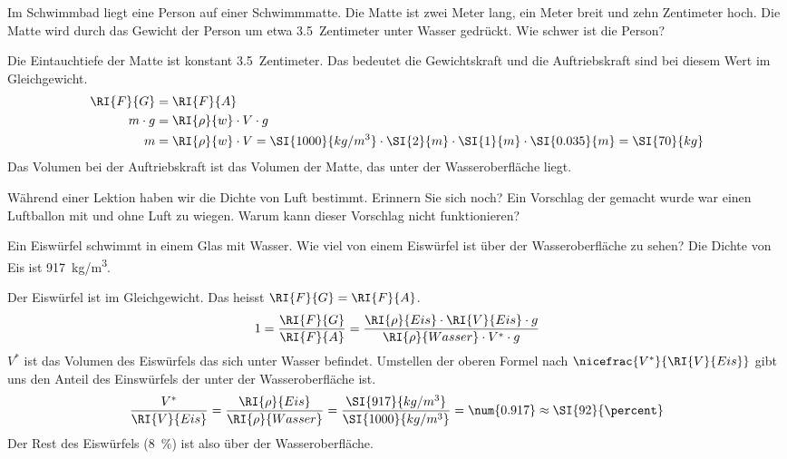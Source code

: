 \begin{aufgabe}
	Im Schwimmbad liegt eine Person auf einer Schwimmmatte.
	Die Matte ist zwei Meter lang, ein Meter breit und zehn Zentimeter hoch.
	Die Matte wird durch das Gewicht der Person um etwa \SI{3.5}{Zentimeter} unter Wasser gedrückt.
	Wie schwer ist die Person?
	
	
	\begin{loesung}
		Die Eintauchtiefe der Matte ist konstant \SI{3.5}{Zentimeter}. 
		Das bedeutet die Gewichtskraft und die Auftriebskraft sind bei diesem Wert im Gleichgewicht.
		\begin{eqnarray*}
			\begin{split}
		\RI{F}{G}&=\RI{F}{A}\\
		m\cdot g &=\RI{\rho}{w}\cdot V\cdot g\\
		m&=\RI{\rho}{w}\cdot V = \SI{1000}{kg/m^3}\cdot\SI{2}{m}\cdot\SI{1}{m}\cdot\SI{0.035}{m}=\SI{70}{kg}
			\end{split}
		\end{eqnarray*}
Das Volumen bei der Auftriebskraft ist das Volumen der Matte, das unter der Wasseroberfläche liegt.
	\end{loesung}
\end{aufgabe}


\begin{aufgabe}
	Während einer Lektion haben wir die Dichte von Luft bestimmt. Erinnern Sie sich noch?
	Ein Vorschlag der gemacht wurde war einen Luftballon mit und ohne Luft zu wiegen.
	Warum kann dieser Vorschlag nicht funktionieren?
\end{aufgabe}

\begin{aufgabe}
	Ein Eiswürfel schwimmt in einem Glas mit Wasser. 
	Wie viel von einem Eiswürfel ist über der Wasseroberfläche zu sehen?
	Die Dichte von Eis ist \SI{917}{kg/m^3}.


	\begin{loesung}
		Der Eiswürfel ist im Gleichgewicht. Das heisst $\RI{F}{G}=\RI{F}{A}$.
		\begin{eqnarray*}
			1=\frac{\RI{F}{G}}{\RI{F}{A}}=\frac{\RI{\rho}{Eis}\cdot\RI{V}{Eis}\cdot g}{\RI{\rho}{Wasser}\cdot V^*\cdot g}
		\end{eqnarray*}
		$V^*$ ist das Volumen des Eiswürfels das sich unter Wasser befindet.
		Umstellen der oberen Formel nach $\nicefrac{V^*}{\RI{V}{Eis}}$ gibt uns den Anteil des Einswürfels der unter
		der Wasseroberfläche ist.
		\begin{eqnarray*}
			\frac{V^*}{\RI{V}{Eis}}=\frac{\RI{\rho}{Eis}}{\RI{\rho}{Wasser}} = \frac{\SI{917}{kg/m^3}}{\SI{1000}{kg/m^3}}=\num{0.917}\approx\SI{92}{\percent}
		\end{eqnarray*}
		Der Rest des Eiswürfels (\SI{8}{\percent}) ist also über der Wasseroberfläche.
	\end{loesung}
\end{aufgabe}


